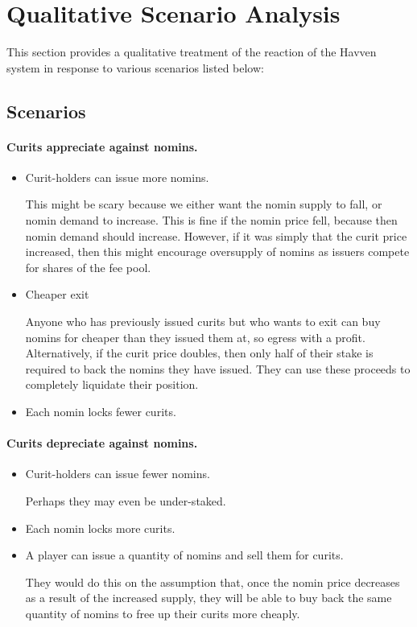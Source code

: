 
\section{Qualitative Scenario Analysis}

This section provides a qualitative treatment of the reaction of the Havven system in response to various scenarios listed below:


\subsection{Scenarios}

\paragraph{Curits appreciate against nomins.}
\begin{itemize}
	\item{Curit-holders can issue more nomins.}

	This might be scary because we either want the nomin supply to fall, or nomin demand to increase.
	This is fine if the nomin price fell, because then nomin demand should increase.
	However, if it was simply that the curit price increased, then this might encourage
	oversupply of nomins as issuers compete for shares of the fee pool.

	\item{Cheaper exit}

	Anyone who has previously issued curits but who wants to exit can buy nomins for
	cheaper than they issued them at, so egress with a profit.
	Alternatively, if the curit price doubles, then only half of their stake is required
	to back the nomins they have issued. They can use these proceeds to completely liquidate
	their position.

	\item{Each nomin locks fewer curits.}
	
\end{itemize}

\paragraph{Curits depreciate against nomins.}
\begin{itemize}
	\item{Curit-holders can issue fewer nomins.}
	
	Perhaps they may even be under-staked.

	\item{Each nomin locks more curits.}
	\item{A player can issue a quantity of nomins and sell them for curits.}
		  
	They would do this on the assumption that, once the nomin price decreases as a result of the increased
	supply, they will be able to buy back the same quantity of nomins to free up their
	curits more cheaply.
\end{itemize}

